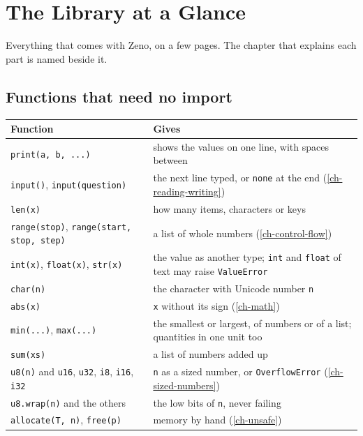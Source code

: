 \chapter{The Library at a Glance}\label{app-library}

Everything that comes with Zeno, on a few pages. The chapter that
explains each part is named beside it.

\section*{Functions that need no import}

\begin{center}
\begin{longtable}{lP{8.1cm}}
\toprule
Function & Gives \\
\midrule
\endhead
\verb|print(a, b, ...)| & shows the values on one line, with spaces between \\
\verb|input()|, \verb|input(question)| & the next line typed, or \verb|none| at the end (\hyperref[ch-reading-writing]{\ref*{ch-reading-writing}}) \\
\verb|len(x)| & how many items, characters or keys \\
\verb|range(stop)|, \verb|range(start, stop, step)| & a list of whole numbers (\hyperref[ch-control-flow]{\ref*{ch-control-flow}}) \\
\verb|int(x)|, \verb|float(x)|, \verb|str(x)| & the value as another type; \verb|int| and \verb|float| of text may raise \verb|ValueError| \\
\verb|char(n)| & the character with Unicode number \verb|n| \\
\verb|abs(x)| & \verb|x| without its sign (\hyperref[ch-math]{\ref*{ch-math}}) \\
\verb|min(...)|, \verb|max(...)| & the smallest or largest, of numbers or of a list; quantities in one unit too \\
\verb|sum(xs)| & a list of numbers added up \\
\verb|u8(n)| and \verb|u16|, \verb|u32|, \verb|i8|, \verb|i16|, \verb|i32| & \verb|n| as a sized number, or \verb|OverflowError| (\hyperref[ch-sized-numbers]{\ref*{ch-sized-numbers}}) \\
\verb|u8.wrap(n)| and the others & the low bits of \verb|n|, never failing \\
\verb|allocate(T, n)|, \verb|free(p)| & memory by hand (\hyperref[ch-unsafe]{\ref*{ch-unsafe}}) \\
\bottomrule
\end{longtable}
\end{center}

